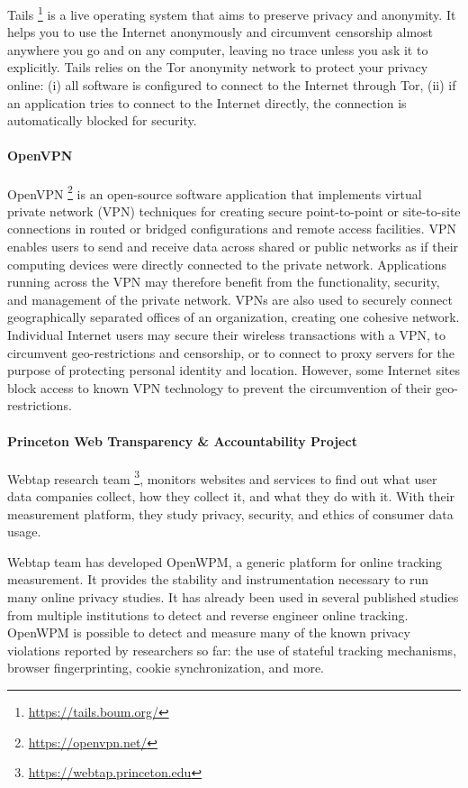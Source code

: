 Tails \footnote{\url{https://tails.boum.org/}} is a live  operating system that 
aims to preserve privacy and anonymity. 
It helps you to use the Internet anonymously and circumvent censorship almost 
anywhere you go and on any computer, leaving no trace unless you ask it to 
explicitly. Tails relies on the Tor anonymity network to protect your privacy 
online: (i) all software is configured to connect to the Internet through Tor,
(ii) if an application tries to connect to the Internet directly, the connection 
is automatically blocked for security.

\paragraph{OpenVPN}

OpenVPN \footnote{\url{https://openvpn.net/}} is an open-source software 
application that implements virtual private 
network (VPN) techniques for creating secure point-to-point or site-to-site 
connections in routed or bridged configurations and remote access facilities.
VPN enables users to send and receive data across shared or public networks as 
if their computing devices were directly connected to the private network. 
Applications running across the VPN may therefore benefit from the functionality, 
security, and management of the private network.
VPNs are  also used to securely connect geographically separated offices of an 
organization, creating one cohesive network. Individual Internet users may 
secure their  wireless transactions with a VPN, to circumvent geo-restrictions 
and censorship, or to connect to proxy servers for the purpose of protecting 
personal identity and location. However, some Internet sites block access to 
known VPN technology to prevent the circumvention of their geo-restrictions.

\paragraph{Princeton Web Transparency \& Accountability Project}

Webtap research team \footnote{\url{https://webtap.princeton.edu}}, monitors 
websites and services to find out what user data 
companies collect, how they collect it, and what they do with it. With their 
measurement platform, they study privacy, security, and ethics of consumer data 
usage.

Webtap team has developed  OpenWPM, a generic platform for online tracking 
measurement. It provides the stability and instrumentation necessary to run many 
online privacy studies. It has already been used in several published studies 
from multiple institutions to detect and reverse engineer online tracking.
OpenWPM  is possible to detect and measure many of the known privacy violations 
reported by researchers so far: the use of stateful tracking mechanisms, browser 
fingerprinting, cookie synchronization, and more.

